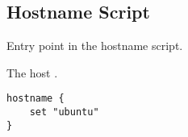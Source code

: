 \subsection{Hostname Script}



Entry point in the hostname script.


The host .

\begin{lstlisting}[style=Java]
hostname {
    set "ubuntu"
}
\end{lstlisting}

